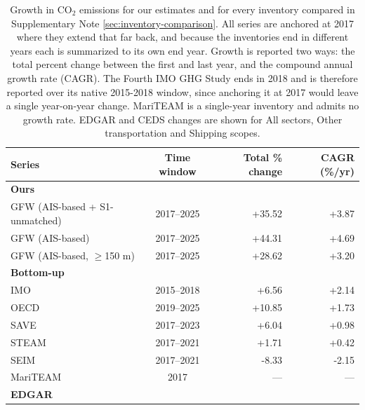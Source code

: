 \begin{table}[!h]
\centering
\caption{\label{tab:inventory_growth_comparison}Growth in CO$_2$ emissions for our estimates and for every inventory compared in Supplementary Note \ref{sec:inventory-comparison}. All series are anchored at 2017 where they extend that far back, and because the inventories end in different years each is summarized to its own end year. Growth is reported two ways: the total percent change between the first and last year, and the compound annual growth rate (CAGR). The Fourth IMO GHG Study ends in 2018 and is therefore reported over its native 2015-2018 window, since anchoring it at 2017 would leave a single year-on-year change. MariTEAM is a single-year inventory and admits no growth rate. EDGAR and CEDS changes are shown for All sectors, Other transportation and Shipping scopes.}
\centering
\fontsize{8}{10}\selectfont
\begin{tabular}[t]{l|c|r|r}
\hline
Series & Time window & Total \% change & CAGR (\%/yr)\\
\hline
\multicolumn{4}{l}{\textbf{Ours}}\\
\hline
\hspace{1em}GFW (AIS-based + S1-unmatched) & 2017--2025 & +35.52 & +3.87\\
\hline
\hspace{1em}GFW (AIS-based) & 2017--2025 & +44.31 & +4.69\\
\hline
\hspace{1em}GFW (AIS-based, $\geq$150 m) & 2017--2025 & +28.62 & +3.20\\
\hline
\multicolumn{4}{l}{\textbf{Bottom-up}}\\
\hline
\hspace{1em}IMO & 2015--2018 & +6.56 & +2.14\\
\hline
\hspace{1em}OECD & 2019--2025 & +10.85 & +1.73\\
\hline
\hspace{1em}SAVE & 2017--2023 & +6.04 & +0.98\\
\hline
\hspace{1em}STEAM & 2017--2021 & +1.71 & +0.42\\
\hline
\hspace{1em}SEIM & 2017--2021 & -8.33 & -2.15\\
\hline
\hspace{1em}MariTEAM & 2017 & --- & ---\\
\hline
\multicolumn{4}{l}{\textbf{EDGAR}}\\
\hline

\end{tabular}
\end{table}
